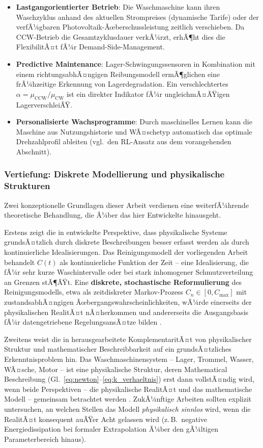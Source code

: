 ﻿\documentclass[12pt,a4paper]{article}
\theoremstyle{remark}
\newcommand{\CCW}{\mathrm{CCW}}
\newcommand{\CW}{\mathrm{CW}}
\begin{document}
	\begin{itemize}
		\item \textbf{Lastgangorientierter Betrieb}: Die Waschmaschine kann ihren
		Waschzyklus anhand des aktuellen Strompreises (dynamische Tarife) oder der
		verfÃ¼gbaren Photovol\-taik-Ãœberschussleistung zeitlich verschieben. Da CCW-Betrieb
		die Gesamtzyklusdauer verkÃ¼rzt, erhÃ¶ht dies die FlexibilitÃ¤t fÃ¼r Demand-Side-Management.
		\item \textbf{Predictive Maintenance}: Lager-Schwingungssensoren in Kombination
		mit einem richtungsabhÃ¤ngigen Reibungsmodell ermÃ¶glichen eine frÃ¼hzeitige Erkennung
		von Lagerdegradation. Ein verschlechtertes $\alpha = \mu_{\CCW}/\mu_{\CW}$ ist ein
		direkter Indikator fÃ¼r ungleichmÃ¤ÃŸigen LagerverschleiÃŸ.
		\item \textbf{Personalisierte Wachsprogramme}: Durch maschinelles Lernen kann die
		Maschine aus Nutzungshistorie und WÃ¤schetyp automatisch das optimale Drehzahlprofil
		ableiten (vgl.\ den RL-Ansatz aus dem vorangehenden Abschnitt).
	\end{itemize}
	
	\subsubsection{Vertiefung: Diskrete Modellierung und physikalische Strukturen}
	
	Zwei konzeptionelle Grundlagen dieser Arbeit verdienen eine weiterfÃ¼hrende theoretische
	Behandlung, die Ã¼ber das hier Entwickelte hinausgeht.
	
	Erstens zeigt die in \cite{epp2026digi} entwickelte Perspektive, dass physikalische
	Systeme grundsÃ¤tzlich durch diskrete Beschreibungen besser erfasst werden als durch
	kontinuierliche Idealisierungen. Das Reinigungsmodell der vorliegenden Arbeit behandelt
	$C(t)$ als kontinuierliche Funktion der Zeit -- eine Idealisierung, die fÃ¼r sehr kurze
	Waschintervalle oder bei stark inhomogener Schmutzverteilung an Grenzen stÃ¶ÃŸt.
	Eine \textbf{diskrete, stochastische Reformulierung} des Reinigungsmodells, etwa als
	zeitdiskreter Markov-Prozess $C_n \in [0, C_{\max}]$ mit zustandsabhÃ¤ngigen
	Ãœbergangswahrscheinlichkeiten, wÃ¼rde einerseits der physikalischen RealitÃ¤t nÃ¤herkommen
	und andererseits die Ausgangsbasis fÃ¼r datengetriebene RegelungsansÃ¤tze bilden
	\cite{epp2026digi}.
	
	Zweitens weist die in \cite{epp2026physd} herausgearbeitete KomplementaritÃ¤t von
	physikalischer Struktur und mathematischer Beschreibbarkeit auf ein grundsÃ¤tzliches
	Erkenntnisproblem hin. Das Waschmaschinensystem -- Lager, Trommel, Wasser, WÃ¤sche,
	Motor -- ist eine physikalische Struktur, deren Mathematical Beschreibung (Gl.\
	\eqref{eq:newton}--\eqref{eq:k_verhaeltnis}) erst dann vollstÃ¤ndig wird, wenn beide
	Perspektiven -- die physikalische RealitÃ¤t und das mathematische Modell -- gemeinsam
	betrachtet werden \cite{epp2026physd}. ZukÃ¼nftige Arbeiten sollten explizit untersuchen,
	an welchen Stellen das Modell \emph{physikalisch sinnlos} wird, wenn die RealitÃ¤t
	konsequent auÃŸer Acht gelassen wird (z.\,B.\ negative Energiedissipation bei formaler
	Extrapolation Ã¼ber den gÃ¼ltigen Parameterbereich hinaus).
	
\end{document}
